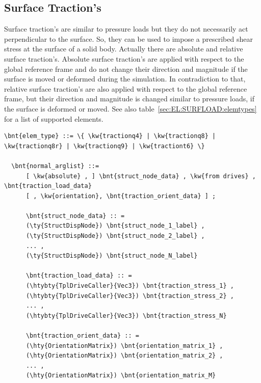 \subsection{Surface Traction's}
Surface traction's are similar to pressure loads but they do not necessarily act perpendicular to the surface.
So, they can be used to impose a prescribed shear stress at the surface of a solid body.
Actually there are absolute and relative surface traction's. Absolute surface traction's are applied with respect
to the global reference frame and do not change their direction and magnitude if the surface is moved
or deformed during the simulation. In contradiction to that, relative surface traction's are also applied with respect
to the global reference frame, but their direction and magnitude is changed similar to pressure loads, if the surface is deformed or moved.
See also table~\ref{sec:EL:SURFLOAD:elemtypes} for a list of supported elements.
\begin{Verbatim}[commandchars=\\\{\}]
  \bnt{elem_type} ::= \{ \kw{tractionq4} | \kw{tractionq8} | \kw{tractionq8r} | \kw{tractionq9} | \kw{tractiont6} \}

  \bnt{normal_arglist} ::=
      [ \kw{absolute} , ] \bnt{struct_node_data} , \kw{from drives} , \bnt{traction_load_data}
      [ , \kw{orientation}, \bnt{traction_orient_data} ] ;

      \bnt{struct_node_data} :: =
      (\ty{StructDispNode}) \bnt{struct_node_1_label} ,
      (\ty{StructDispNode}) \bnt{struct_node_2_label} ,
      ... ,
      (\ty{StructDispNode}) \bnt{struct_node_N_label}

      \bnt{traction_load_data} :: =
      (\htybty{TplDriveCaller}{Vec3}) \bnt{traction_stress_1} ,
      (\htybty{TplDriveCaller}{Vec3}) \bnt{traction_stress_2} ,
      ... ,
      (\htybty{TplDriveCaller}{Vec3}) \bnt{traction_stress_N}

      \bnt{traction_orient_data} :: =
      (\hty{OrientationMatrix}) \bnt{orientation_matrix_1} ,
      (\hty{OrientationMatrix}) \bnt{orientation_matrix_2} ,
      ... ,
      (\hty{OrientationMatrix}) \bnt{orientation_matrix_M}
\end{Verbatim}

